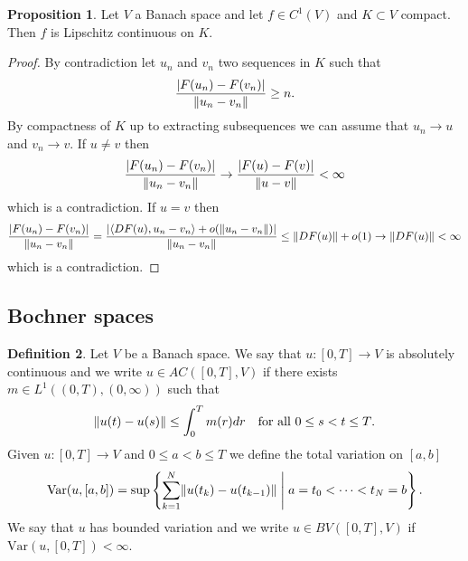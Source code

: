 \documentclass[letterpaper,oneside]{amsart}
\numberwithin{equation}{section}
\theoremstyle{definition}
\newtheorem{prop}{Proposition}[section]
\newtheorem{defi}[prop]{Definition}
\DeclarePairedDelimiter{\norm}{\lVert}{\rVert}
\DeclarePairedDelimiter{\dual}{\langle}{\rangle}
\begin{document}
\begin{prop}
\label{prop:Lipschitz-c1-compact}
Let $V$ a Banach space and let $f\in C^1(V)$ and $K\subset V$ compact. Then $f$ is Lipschitz continuous on $K$.
\end{prop}
\begin{proof}
By contradiction let $u_n$ and $v_n$ two sequences in $K$ such that
\begin{equation*}
\frac{|F(u_n)-F(v_n)|}{\norm{u_n-v_n}}\ge n.
\end{equation*}
By compactness of $K$ up to extracting subsequences we can assume that $u_n\to u$ and $v_n\to v$. If $u\neq v$ then
\begin{equation*}
\frac{|F(u_n)-F(v_n)|}{\norm{u_n-v_n}}\to\frac{|F(u)-F(v)|}{\norm{u-v}}<\infty
\end{equation*}
which is a contradiction. If $u=v$ then
\begin{equation*}
\frac{|F(u_n)-F(v_n)|}{\norm{u_n-v_n}}=\frac{|\dual{DF(u),u_n-v_n}+o(\norm{u_n-v_n})|}{\norm{u_n-v_n}}\le\norm{DF(u)}+o(1)\to\norm{DF(u)}<\infty
\end{equation*}
which is a contradiction.
\end{proof}



\subsection{Bochner spaces}

\begin{defi}
\label{defi:ac-bv}
Let $V$ be a Banach space. We say that $u\colon[0,T]\to V$ is absolutely continuous and we write $u\in AC([0,T],V)$ if there exists $m\in L^1((0,T),(0,\infty))$ such that
\begin{equation*}
\norm{u(t)-u(s)}\le\int_0^Tm(r)dr\quad\text{for all $0\le s<t\le T$.}
\end{equation*}
Given $u\colon[0,T]\to V$ and $0\le a<b\le T$ we define the total variation on $[a,b]$
\begin{equation*}
\text{Var}(u,[a,b])=\sup\left\{\sum_{k=1}^N\norm{u(t_k)-u(t_{k-1})}\;\middle|\;a=t_0<\dots<t_N=b\right\}.
\end{equation*}
We say that $u$ has bounded variation and we write $u\in BV([0,T],V)$ if $\text{Var}(u,[0,T])<\infty$.
\end{defi}
\end{document}
